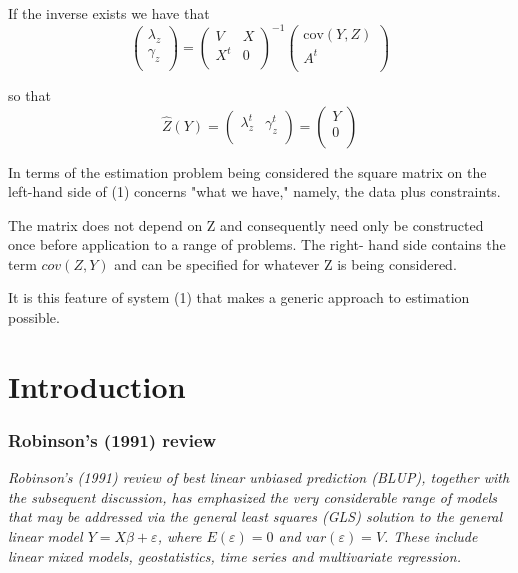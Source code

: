 \documentclass[12pt, a4paper]{article}
\begin{document}
If the inverse exists we have that
\begin{equation}
\left(
\begin{array}{c}
\lambda_{z}\\
\gamma_z \\
\end{array}
\right)=\left(
\begin{array}{cc}
V & X \\
X^t & 0 \\
\end{array}
\right) ^{-1}\left(
\begin{array}{c}
\mbox{cov}(Y,Z)\\
A^{t} \\
\end{array}
\right)
\end{equation}



so that
\[ \hat{Z}(Y) =
\left(
\begin{array}{cc}
\lambda_{z}^{t}&
\gamma_z^{t} \\
\end{array}
\right)=\left(
\begin{array}{c}
Y \\
0 \\
\end{array}
\right) \]

In terms of the estimation problem being considered the square matrix on the left-hand side of (1) concerns "what we have," namely, the data plus constraints.

The matrix does not depend on Z and consequently need only be constructed once before application to a range of problems. The right- hand side contains the term $cov(Z,Y)$ and can be specified for whatever Z is being considered.

It is this feature of system (1) that makes a generic approach to estimation possible.



\section{Introduction}
\subsubsection{Robinson's (1991) review}
\emph{ Robinson's (1991) review of best linear unbiased prediction (BLUP), together with the subsequent discussion, has emphasized the very considerable range of models that may be addressed via the general least squares (GLS) solution to the general linear model $Y = X\beta + \varepsilon$, where $E(\varepsilon) = 0$ and $var(\varepsilon) = V$. These include linear mixed models, geostatistics, time series and multivariate regression.}
\end{document}
